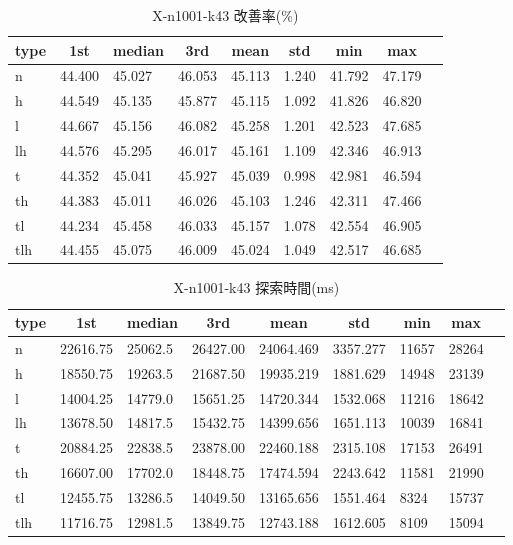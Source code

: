 \begin{table}[htbp]
    \centering
    \caption{X-n1001-k43 改善率(\%)}
    \begin{tabular}{|l|l|l|l|l|l|l|l|l|}\hline
    \multicolumn{1}{|c|}{\textbf{type}}
    &\multicolumn{1}{|c|}{\textbf{1st}}
    &\multicolumn{1}{c|}{\textbf{median}}
    &\multicolumn{1}{c|}{\textbf{3rd}}
    &\multicolumn{1}{c|}{\textbf{mean}}
    &\multicolumn{1}{c|}{\textbf{std}}
    &\multicolumn{1}{c|}{\textbf{min}}
    &\multicolumn{1}{c|}{\textbf{max}}\\\hline
	n & 44.400 & 45.027 & 46.053 & 45.113 & 1.240 & 41.792 & 47.179\\\hline
	h & 44.549 & 45.135 & 45.877 & 45.115 & 1.092 & 41.826 & 46.820\\\hline
	l & 44.667 & 45.156 & 46.082 & 45.258 & 1.201 & 42.523 & 47.685\\\hline
	lh & 44.576 & 45.295 & 46.017 & 45.161 & 1.109 & 42.346 & 46.913\\\hline
	t & 44.352 & 45.041 & 45.927 & 45.039 & 0.998 & 42.981 & 46.594\\\hline
	th & 44.383 & 45.011 & 46.026 & 45.103 & 1.246 & 42.311 & 47.466\\\hline
	tl & 44.234 & 45.458 & 46.033 & 45.157 & 1.078 & 42.554 & 46.905\\\hline
	tlh & 44.455 & 45.075 & 46.009 & 45.024 & 1.049 & 42.517 & 46.685\\\hline
	\end{tabular}
\end{table}
\begin{table}[htbp]
    \centering
    \caption{X-n1001-k43 探索時間(ms)}
    \begin{tabular}{|l|l|l|l|l|l|l|l|l|}\hline
    \multicolumn{1}{|c|}{\textbf{type}}
    &\multicolumn{1}{|c|}{\textbf{1st}}
    &\multicolumn{1}{c|}{\textbf{median}}
    &\multicolumn{1}{c|}{\textbf{3rd}}
    &\multicolumn{1}{c|}{\textbf{mean}}
    &\multicolumn{1}{c|}{\textbf{std}}
    &\multicolumn{1}{c|}{\textbf{min}}
    &\multicolumn{1}{c|}{\textbf{max}}\\\hline
	n & 22616.75 & 25062.5 & 26427.00 & 24064.469 & 3357.277 & 11657 & 28264\\\hline
	h & 18550.75 & 19263.5 & 21687.50 & 19935.219 & 1881.629 & 14948 & 23139\\\hline
	l & 14004.25 & 14779.0 & 15651.25 & 14720.344 & 1532.068 & 11216 & 18642\\\hline
	lh & 13678.50 & 14817.5 & 15432.75 & 14399.656 & 1651.113 & 10039 & 16841\\\hline
	t & 20884.25 & 22838.5 & 23878.00 & 22460.188 & 2315.108 & 17153 & 26491\\\hline
	th & 16607.00 & 17702.0 & 18448.75 & 17474.594 & 2243.642 & 11581 & 21990\\\hline
	tl & 12455.75 & 13286.5 & 14049.50 & 13165.656 & 1551.464 & 8324 & 15737\\\hline
	tlh & 11716.75 & 12981.5 & 13849.75 & 12743.188 & 1612.605 & 8109 & 15094\\\hline
	\end{tabular}
\end{table}
